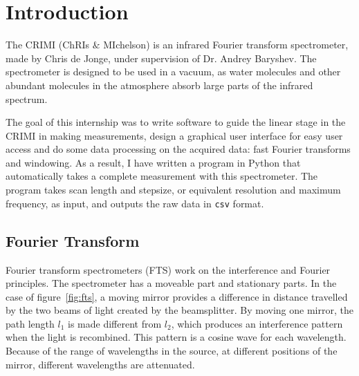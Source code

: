 
\section{Introduction}
The CRIMI (ChRIs $\&$ MIchelson) is an infrared Fourier transform spectrometer, made by Chris de Jonge, under supervision of Dr. Andrey Baryshev. The spectrometer is designed to be used in a vacuum, as water molecules and other abundant molecules in the atmosphere absorb large parts of the infrared spectrum.

The goal of this internship was to write software to guide the linear stage in the CRIMI in making measurements, design a graphical user interface for easy user access and do some data processing on the acquired data: fast Fourier transforms and windowing. As a result, I have written a program in Python that automatically takes a complete measurement with this spectrometer. The program takes scan length and stepsize, or equivalent resolution and maximum frequency, as input, and outputs the raw data in \verb!csv! format.


\subsection{Fourier Transform}

Fourier transform spectrometers (FTS) work on the interference and Fourier principles. The spectrometer has a moveable part and stationary parts. In the case of figure~\ref{fig:fts}, a moving mirror provides a difference in distance travelled by the two beams of light created by the beamsplitter. By moving one mirror, the path length $l_1$ is made different from $l_2$, which produces an interference pattern when the light is recombined. This pattern is a cosine wave for each wavelength. Because of the range of wavelengths in the source, at different positions of the mirror, different wavelengths are attenuated.

